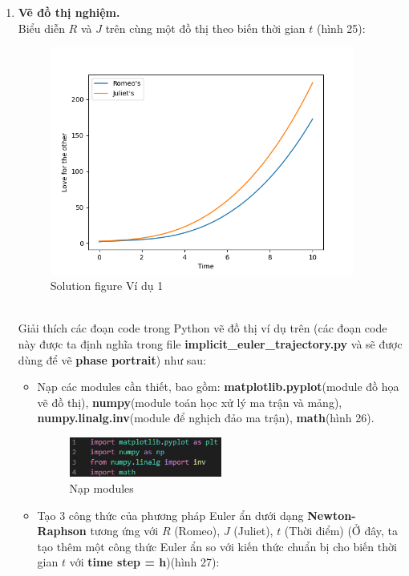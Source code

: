 \begin{enumerate}
    \item \textbf{Vẽ đồ thị nghiệm.}\\
    Biểu diễn $R$ và $J$ trên cùng một đồ thị theo biến thời gian $t$ (hình 25):
    \begin{figure}[h!]
        \begin{center}
        \includegraphics[width=10cm]{images/euler_1.png}
        \end{center}
        \caption{Solution figure Ví dụ 1}
    \end{figure}\\
    Giải thích các đoạn code trong Python vẽ đồ thị ví dụ trên (các đoạn code này được ta định nghĩa trong file \textbf{implicit\_euler\_trajectory.py} và sẽ được dùng để vẽ \textbf{phase portrait}) như sau:
    \begin{itemize}
        \item Nạp các modules cần thiết, bao gồm: \textbf{matplotlib.pyplot}(module đồ họa vẽ đồ thị), \textbf{numpy}(module toán học xử lý ma trận và mảng), \textbf{numpy.linalg.inv}(module để nghịch đảo ma trận), \textbf{math}(hình 26).
        \begin{figure}[h!]
            \begin{center}
            \includegraphics[width=5cm]{images/euler_modules.png}
            \end{center}
            \caption{Nạp modules}
        \end{figure}
        \item Tạo 3 công thức của phương pháp Euler ẩn dưới dạng \textbf{Newton-Raphson} tương ứng với $R$ (Romeo), $J$ (Juliet), $t$ (Thời điểm) (Ở đây, ta tạo thêm một công thức Euler ẩn so với kiến thức chuẩn bị cho biến thời gian $t$ với \textbf{time step = h})(hình 27):

\end{itemize}
\end{enumerate}
